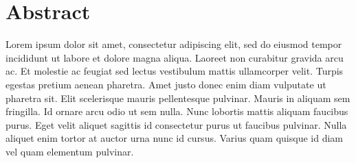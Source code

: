 %
%
%
%
%



\section{Abstract}
Lorem ipsum dolor sit amet, consectetur adipiscing elit, sed do eiusmod tempor incididunt ut labore
et dolore magna aliqua. Laoreet non curabitur gravida arcu ac. Et molestie ac feugiat sed lectus
vestibulum mattis ullamcorper velit. Turpis egestas pretium aenean pharetra. Amet justo donec enim
diam vulputate ut pharetra sit. Elit scelerisque mauris pellentesque pulvinar. Mauris in aliquam
sem fringilla. Id ornare arcu odio ut sem nulla. Nunc lobortis mattis aliquam faucibus purus. Eget
velit aliquet sagittis id consectetur purus ut faucibus pulvinar. Nulla aliquet enim tortor at
auctor urna nunc id cursus. Varius quam quisque id diam vel quam elementum pulvinar.
\parencite{test}